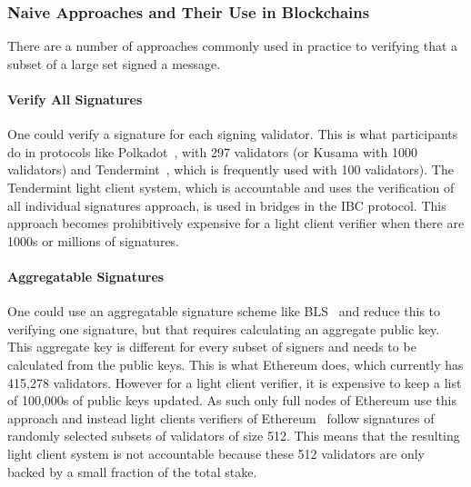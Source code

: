 \subsubsection{Naive Approaches and Their Use in Blockchains}
There are a number of approaches commonly used in practice to verifying that a subset of a large set signed a message.
\vspace{-0.2cm}
\noindent \paragraph{Verify All Signatures}  One could verify a signature for each signing validator. This is what participants  do in protocols like Polkadot~\cite{polkadot}, with 297 validators
(or Kusama with 1000 validators) %
and Tendermint~\cite{tendermint_paper}, which is frequently used with 100 validators). %
The Tendermint light client system, which is accountable and uses the verification of all individual signatures approach,
is used in bridges in the IBC protocol\cite{IBC_paper}. This approach becomes prohibitively expensive for a light client verifier when there are 1000s or millions of signatures.
\vspace{-0.1in}
\noindent \paragraph{Aggregatable Signatures} One could use an aggregatable signature scheme like BLS~\cite{BLS_signatures,boneh_compact_multisig}  and reduce this to verifying one signature, but that requires calculating an aggregate public key. This aggregate key is different for every subset of signers and needs to be calculated from the public keys. This is what Ethereum
does, which currently has 415,278 validators. %
However for a light client verifier, it is expensive to keep a list of 100,000s of public keys updated. As such only full nodes of Ethereum use this approach and instead light clients verifiers of Ethereum~\cite{sync_committee} follow signatures of randomly selected subsets of validators of size 512. This means that the resulting light client system is not accountable because these 512 validators are only backed by a small fraction of the total stake.
\vspace{-0.2cm}
